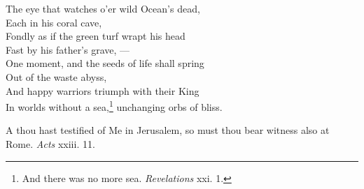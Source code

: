   The eye that watches o’er wild Ocean’s dead, \\
 Each in his coral cave, \\
 Fondly as if the green turf wrapt his head \\
 Fast by his father’s grave, — \\
 One moment, and the seeds of life shall spring \\
 Out of the waste abyss, \\
 And happy warriors triumph with their King \\
 In worlds without a sea,\footnote{And there was no more sea. \emph{Revelations} xxi. 1.} unchanging orbs of bliss.\\


A thou hast testified of Me in Jerusalem, so must thou bear witness also at Rome. \emph{Acts} xxiii. 11.

